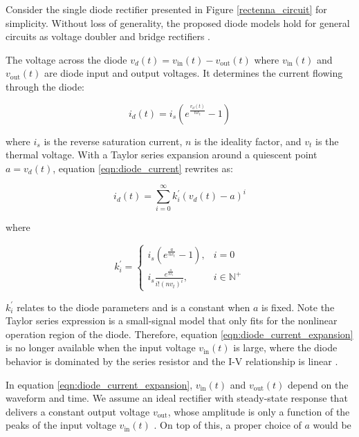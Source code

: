 Consider the single diode rectifier presented in Figure \ref{rectenna_circuit} for simplicity. Without loss of generality, the proposed diode models hold for general circuits as voltage doubler and bridge rectifiers \cite{Clerckx2017}. 

The voltage across the diode ${v_d}(t) = {v_{{\text{in}}}}(t) - {v_{{\text{out}}}}(t)$ where ${v_{{\text{in}}}}(t)$ and ${v_{{\text{out}}}}(t)$ are diode input and output voltages. It determines the current flowing through the diode:

\begin{equation}\label{eqn:diode_current}
  {i_d}(t) = {i_s}\left( {{e^{\frac{{{v_d}(t)}}{{n{v_t}}}}} - 1} \right)
\end{equation}

where ${i_s}$ is the reverse saturation current, $n$ is the ideality factor, and ${{v_t}}$ is the thermal voltage. With a Taylor series expansion around a quiescent point $a = {v_d}(t)$, equation \ref{eqn:diode_current} rewrites as:

\begin{equation}\label{eqn:diode_current_expansion}
  {i_d}(t) = \sum\limits_{i = 0}^\infty  {k_i^\prime } {\left( {{v_d}(t) - a} \right)^i}
\end{equation}

where

\begin{equation}\label{eqn:diode_k_prime}
  k_i^\prime  = 
  \left\{ {
    \begin{array}{*{20}{c}}
      {{i_s}\left( {{e^{\frac{a}{{n{v_t}}}}} - 1} \right),}&{i = 0} \\
      {{i_s}\frac{{{e^{\frac{a}{{n{v_t}}}}}}}{{i!{{\left( {n{v_t}} \right)}^i}}},}&{i \in {\mathbb{N}^ + }}
    \end{array}}
  \right.
\end{equation}


$k_i^\prime $ relates to the diode parameters and is a constant when $a$ is fixed. Note the Taylor series expression is a small-signal model that only fits for the nonlinear operation region of the diode. Therefore, equation \ref{eqn:diode_current_expansion} is no longer available when the input voltage ${v_{{\text{in}}}}(t)$ is large, where the diode behavior is dominated by the series resistor and the I-V relationship is linear \cite{Boaventura2013}.

In equation \ref{eqn:diode_current_expansion}, ${v_{{\text{in}}}}(t)$ and ${v_{{\text{out}}}}(t)$ depend on the waveform and time. We assume an ideal rectifier with steady-state response that delivers a constant output voltage ${v_{{\text{out}}}}$, whose amplitude is only a function of the peaks of the input voltage ${v_{{\text{in}}}}(t)$ \cite{Curty2005}. On top of this, a proper choice of $a$ would be 